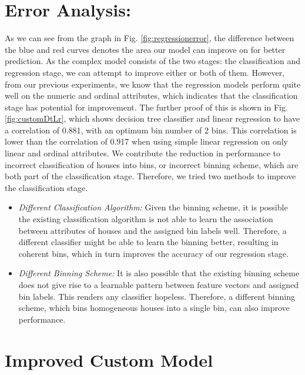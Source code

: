 \documentclass[conference,compsoc]{IEEEtran}
\begin{document}
\section{Error Analysis:}
As we can see from the graph in Fig. \ref{fig:regressionerror}, the difference between the blue and red curves denotes the area our model can improve on for better prediction. As the complex model consists of the two stages: the classification and regression stage, we can attempt to improve either or both of them. However, from our previous experiments, we know that the regression models perform quite well on the numeric and ordinal attributes, which indicates that the classification stage has potential for improvement. The further proof of this is shown in Fig. \ref{fig:customDtLr}, which shows decision tree classifier and linear regression to have a correlation of 0.881, with an optimum bin number of 2 bins. This correlation is lower than the correlation of 0.917 when using simple linear regression on only linear and ordinal attributes. We contribute the reduction in performance to incorrect classification of houses into bins, or incorrect binning scheme, which are both part of the classification stage. Therefore, we tried two methods to improve the classification stage.

\begin{itemize}
\par
\item \textit {Different Classification Algorithm: } Given the binning scheme, it is possible the existing classification algorithm is not able to learn the association between attributes of houses and the assigned bin labels well. Therefore, a different classifier might be able to learn the binning better, resulting in coherent bins, which in turn improves the accuracy of our regression stage.
\item \textit {Different Binning Scheme: } It is also possible that the existing binning scheme does not give rise to a learnable pattern between feature vectors and assigned bin labels. This renders any classifier hopeless. Therefore, a different binning scheme, which bins homogeneous houses into a single bin, can also improve performance.
\end{itemize}


\section {Improved Custom Model}
\end{document}
